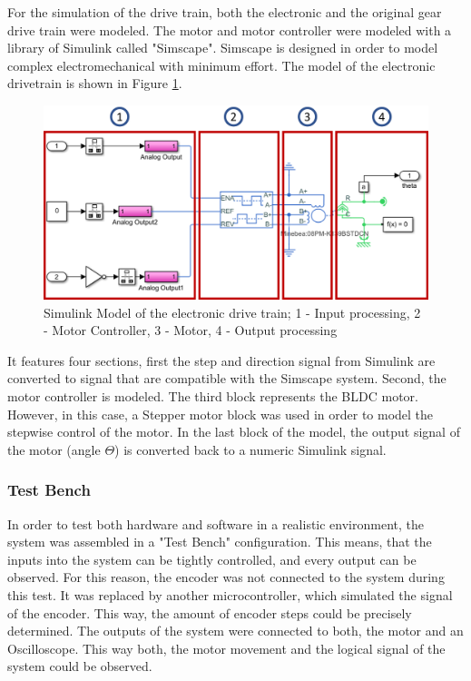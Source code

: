For the simulation of the drive train, both the electronic and the original gear drive train were modeled. The motor and motor controller were modeled with a library of Simulink called "Simscape". Simscape is designed in order to model complex electromechanical with minimum effort. The model of the electronic drivetrain is shown in Figure \ref{SysEDriveT}.
 
\begin{figure}
    \begin{center}
    \includegraphics[width=12cm]{Pictures/SysEDriveT.png}
    \caption[Simulink Model of the electronic drive train]{Simulink Model of the electronic drive train; 1 - Input processing, 2 - Motor Controller, 3 - Motor, 4 - Output processing}
    \label{SysEDriveT}
    \end{center}
\end{figure}
 
It features four sections, first the step and direction signal from Simulink are converted to signal that are compatible with the Simscape system. Second, the motor controller is modeled. The third block represents the BLDC motor. However, in this case, a Stepper motor block was used in order to model the stepwise control of the motor. In the last block of the model, the output signal of the motor (angle $\Theta$) is converted back to a numeric Simulink signal.
 
\subsubsection{Test Bench}
 
In order to test both hardware and software in a realistic environment, the system was assembled in a "Test Bench" configuration. This means, that the inputs into the system can be tightly controlled, and every output can be observed. For this reason, the encoder was not connected to the system during this test. It was replaced by another microcontroller, which simulated the signal of the encoder. This way, the amount of encoder steps could be precisely determined.
The outputs of the system were connected to both, the motor and an Oscilloscope. This way both, the motor movement and the logical signal of the system could be observed.\\
 
